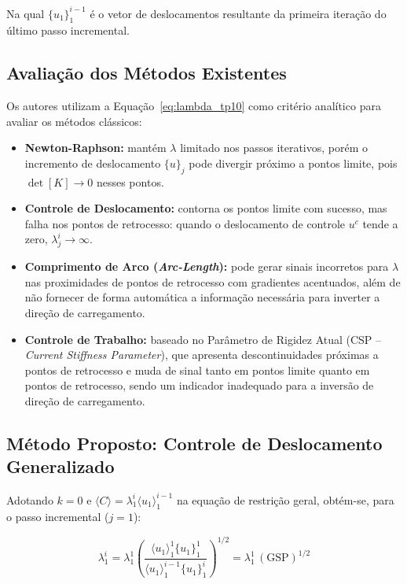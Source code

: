 \begin{textocaixa}
Na qual $\{u_1\}^{i-1}_1$ é o vetor de deslocamentos resultante da primeira iteração do
último passo incremental.

\subsection*{Avaliação dos Métodos Existentes}

Os autores utilizam a Equação~\eqref{eq:lambda_tp10} como critério analítico para avaliar os
métodos clássicos:

\begin{itemize}
	\item \textbf{Newton-Raphson:} mantém $\lambda$ limitado nos passos iterativos, porém o
	incremento de deslocamento $\{u\}_j$ pode divergir próximo a pontos limite, pois
	$\det[K] \to 0$ nesses pontos.

	\item \textbf{Controle de Deslocamento:} contorna os pontos limite com sucesso, mas
	falha nos pontos de retrocesso: quando o deslocamento de controle $u^c$ tende a zero,
	$\lambda^i_j \to \infty$.

	\item \textbf{Comprimento de Arco (\textit{Arc-Length}):} pode gerar sinais incorretos
	para $\lambda$ nas proximidades de pontos de retrocesso com gradientes acentuados, além
	de não fornecer de forma automática a informação necessária para inverter a direção de
	carregamento.

	\item \textbf{Controle de Trabalho:} baseado no Parâmetro de Rigidez Atual (CSP --
	\textit{Current Stiffness Parameter}), que apresenta descontinuidades próximas a pontos
	de retrocesso e muda de sinal tanto em pontos limite quanto em pontos de retrocesso,
	sendo um indicador inadequado para a inversão de direção de carregamento.
\end{itemize}

\subsection*{Método Proposto: Controle de Deslocamento Generalizado}

Adotando $k = 0$ e $\langle C \rangle = \lambda^{i}_{1}\langle u_1 \rangle^{i-1}_{1}$ na
equação de restrição geral, obtém-se, para o passo incremental ($j=1$):

\begin{equation}
	\lambda^{i}_{1} = \lambda^{1}_{1}\left(\frac{\langle u_1 \rangle^{1}_{1}\{u_1\}^{1}_{1}}
								 {\langle u_1 \rangle^{i-1}_{1}\{u_1\}^{i}_{1}}\right)^{1/2}
	= \lambda^{1}_{1}\,(\text{GSP})^{1/2}
\end{equation}


\end{textocaixa}
